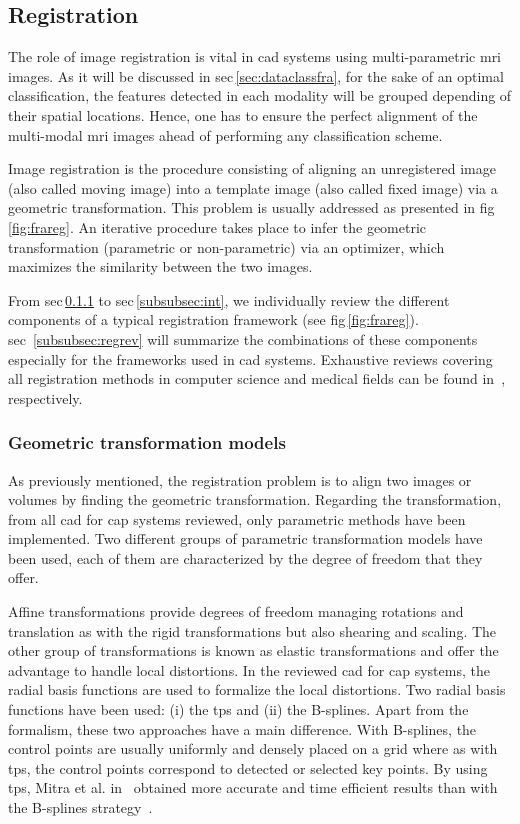 \subsection{Registration} \label{subsec:registration}

The role of image registration is vital in \ac{cad} systems using multi-parametric \ac{mri} images. As it will be discussed in \ac{sec}\,\ref{sec:dataclassfra}, for the sake of an optimal classification, the features detected in each modality will be grouped depending of their spatial locations. Hence, one has to ensure the perfect alignment of the multi-modal \ac{mri} images ahead of performing any classification scheme.

Image registration is the procedure consisting of aligning an unregistered image (also called moving image) into a template image (also called fixed image) via a geometric transformation. This problem is usually addressed as presented in \ac{fig}\,\ref{fig:frareg}. An iterative procedure takes place to infer the geometric transformation (parametric or non-parametric) via an optimizer, which maximizes the similarity between the two images.

From \ac{sec}\,\ref{subsubsec:geotra} to \ac{sec}\,\ref{subsubsec:int}, we individually review the different components of a typical registration framework (see \ac{fig}\,\ref{fig:frareg}). \Acl{sec}~\ref{subsubsec:regrev} will summarize the combinations of these components especially for the frameworks used in \ac{cad} systems. Exhaustive reviews covering all registration methods in computer science and medical fields can be found in~\cite{Maintz1998,Zitova2003}, respectively.

\subsubsection{Geometric transformation models}\label{subsubsec:geotra}

As previously mentioned, the registration problem is to align two images or volumes by finding the geometric transformation. Regarding the transformation, from all \ac{cad} for \ac{cap} systems reviewed, only parametric methods have been implemented. Two different groups of parametric transformation models have been used, each of them are characterized by the degree of freedom that they offer.

Affine transformations provide degrees of freedom managing rotations and translation as with the rigid transformations but also shearing and scaling. The other group of transformations is known as elastic transformations and offer the advantage to handle local distortions. In the reviewed \ac{cad} for \ac{cap} systems, the radial basis functions are used to formalize the local distortions. Two radial basis functions have been used: (i) the \ac{tps} and (ii) the B-splines. Apart from the formalism, these two approaches have a main difference. With B-splines, the control points are usually uniformly and densely placed on a grid where as with \ac{tps}, the control points correspond to detected or selected key points. By using \ac{tps}, Mitra et al. in~\cite{Mitra2011} obtained more accurate and time efficient results than with the B-splines strategy~\cite{Mitra2012a}.

